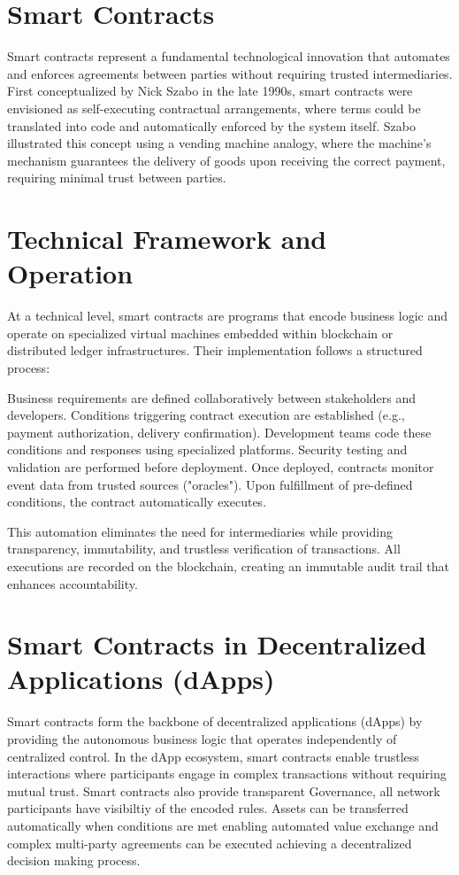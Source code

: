 \documentclass[final]{rc-book-2.14}
\begin{document}
\section{Smart Contracts}

Smart contracts represent a fundamental technological innovation that automates and enforces agreements between parties without requiring trusted intermediaries. First conceptualized by Nick Szabo in the late 1990s, smart contracts were envisioned as self-executing contractual arrangements, where terms could be translated into code and automatically enforced by the system itself\cite{szabo1996smart}. Szabo illustrated this concept using a vending machine analogy, where the machine's mechanism guarantees the delivery of goods upon receiving the correct payment, requiring minimal trust between parties\cite{szabo1997formalizing}.

\section{Technical Framework and Operation}

At a technical level, smart contracts are programs that encode business logic and operate on specialized virtual machines embedded within blockchain or distributed ledger infrastructures. Their implementation follows a structured process:

Business requirements are defined collaboratively between stakeholders and developers. Conditions triggering contract execution are established (e.g., payment authorization, delivery confirmation). Development teams code these conditions and responses using specialized platforms. Security testing and validation are performed before deployment. Once deployed, contracts monitor event data from trusted sources ("oracles"). Upon fulfillment of pre-defined conditions, the contract automatically executes\cite{simplilearn2022smart}.

This automation eliminates the need for intermediaries while providing transparency, immutability, and trustless verification of transactions. All executions are recorded on the blockchain, creating an immutable audit trail that enhances accountability.

\section{Smart Contracts in Decentralized Applications (dApps)}

Smart contracts form the backbone of decentralized applications (dApps) by providing the autonomous business logic that operates independently of centralized control. In the dApp ecosystem, smart contracts enable trustless interactions where participants engage in complex transactions without requiring mutual trust. Smart contracts also provide transparent Governance, all network participants have visibiltiy of the encoded rules. Assets can be transferred automatically when conditions are met enabling automated value exchange and  complex multi-party agreements can be executed achieving a decentralized decision making process\cite{alharby2017blockchain}.
\end{document}
